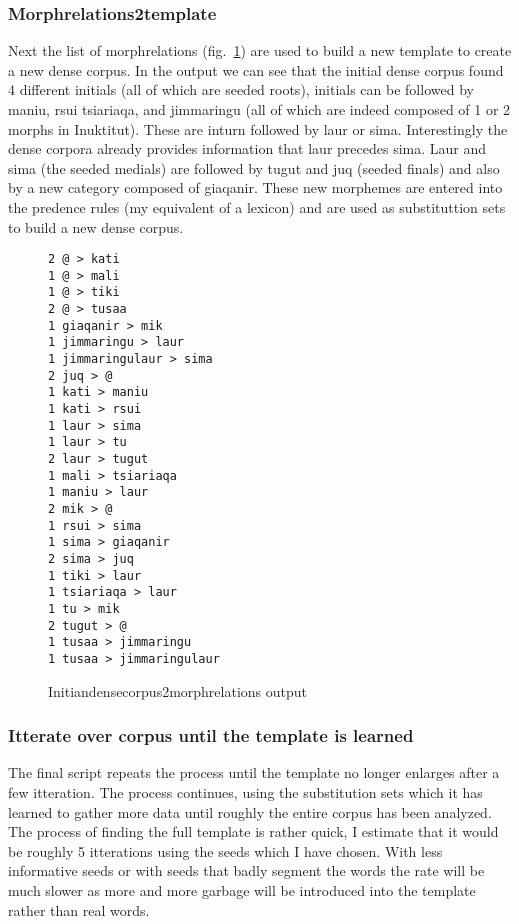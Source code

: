 \documentclass[runningheads,a4paper]{llncs}
\begin{document}
\subsubsection{Morphrelations2template}

Next the list of morphrelations (fig.~\ref{fig:intialdensecorpus2morphrelationsoutput}) are used to build a new template to create a new dense corpus. In the output we can see that the initial dense corpus found 4 different initials (all of which are seeded roots), initials can be followed by maniu, rsui tsiariaqa, and jimmaringu (all of which are indeed composed of 1 or 2 morphs in Inuktitut). These are inturn followed by laur or sima. Interestingly the dense corpora already provides information that laur precedes sima. Laur and sima (the seeded medials) are followed by tugut and juq (seeded finals) and also by a new category  composed of giaqanir. These new morphemes are entered into the predence rules (my equivalent of a lexicon) and are used as substituttion sets to build a new dense corpus.

\begin{figure}[htb]
\begin{verbatim}
2 @ > kati
1 @ > mali
1 @ > tiki
2 @ > tusaa
1 giaqanir > mik
1 jimmaringu > laur
1 jimmaringulaur > sima
2 juq > @
1 kati > maniu
1 kati > rsui
1 laur > sima
1 laur > tu
2 laur > tugut
1 mali > tsiariaqa
1 maniu > laur
2 mik > @
1 rsui > sima
1 sima > giaqanir
2 sima > juq
1 tiki > laur
1 tsiariaqa > laur
1 tu > mik
2 tugut > @
1 tusaa > jimmaringu
1 tusaa > jimmaringulaur
\end{verbatim}
	\caption{Initiandensecorpus2morphrelations output}
	\label{fig:intialdensecorpus2morphrelationsoutput}
\end{figure}


\subsubsection{Itterate over corpus until the template is learned}

The final script repeats the process until the template no longer enlarges after a few itteration. The process continues, using the substitution sets which it has learned to gather more data until roughly the entire corpus has been analyzed. The process of finding the full template is rather quick, I estimate that it would be roughly 5 itterations using the seeds which I have chosen. With less informative seeds or with seeds that badly segment the words the rate will be much slower as more and more garbage will be introduced into the template rather than real words. 
\end{document}
